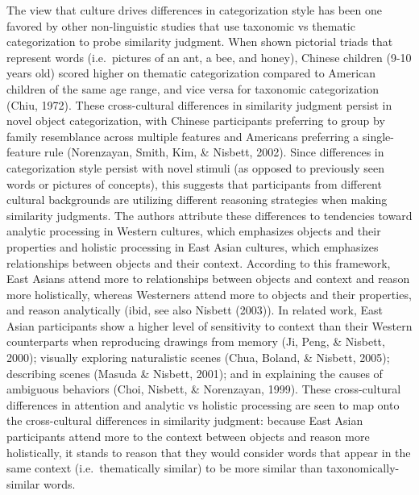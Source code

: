 \documentclass[10pt, letterpaper]{article}
\begin{document}
The view that culture drives differences in categorization style has
been one favored by other non-linguistic studies that use taxonomic vs
thematic categorization to probe similarity judgment. When shown
pictorial triads that represent words (i.e.~pictures of an ant, a bee,
and honey), Chinese children (9-10 years old) scored higher on thematic
categorization compared to American children of the same age range, and
vice versa for taxonomic categorization (Chiu, 1972). These
cross-cultural differences in similarity judgment persist in novel
object categorization, with Chinese participants preferring to group by
family resemblance across multiple features and Americans preferring a
single-feature rule (Norenzayan, Smith, Kim, \& Nisbett, 2002). Since
differences in categorization style persist with novel stimuli (as
opposed to previously seen words or pictures of concepts), this suggests
that participants from different cultural backgrounds are utilizing
different reasoning strategies when making similarity judgments. The
authors attribute these differences to tendencies toward analytic
processing in Western cultures, which emphasizes objects and their
properties and holistic processing in East Asian cultures, which
emphasizes relationships between objects and their context. According to
this framework, East Asians attend more to relationships between objects
and context and reason more holistically, whereas Westerners attend more
to objects and their properties, and reason analytically (ibid, see also
Nisbett (2003)). In related work, East Asian participants show a higher
level of sensitivity to context than their Western counterparts when
reproducing drawings from memory (Ji, Peng, \& Nisbett, 2000); visually
exploring naturalistic scenes (Chua, Boland, \& Nisbett, 2005);
describing scenes (Masuda \& Nisbett, 2001); and in explaining the
causes of ambiguous behaviors (Choi, Nisbett, \& Norenzayan, 1999).
These cross-cultural differences in attention and analytic vs holistic
processing are seen to map onto the cross-cultural differences in
similarity judgment: because East Asian participants attend more to the
context between objects and reason more holistically, it stands to
reason that they would consider words that appear in the same context
(i.e.~thematically similar) to be more similar than
taxonomically-similar words.
\end{document}
